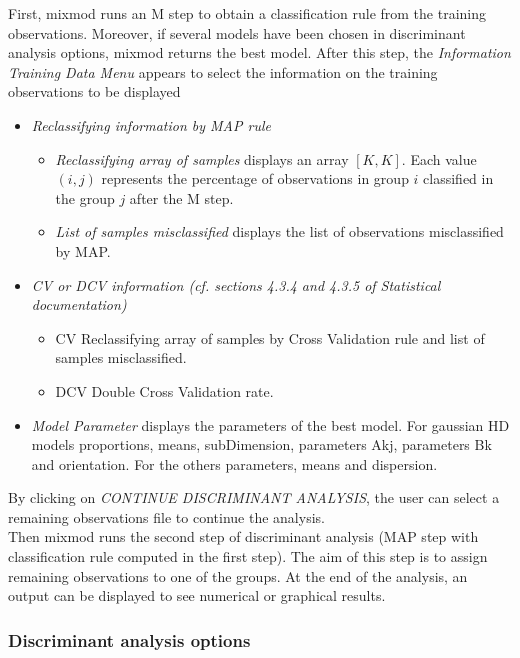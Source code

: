 First, {\sc mixmod} runs an M step to obtain a classification rule from the training observations. Moreover, if several models
have been chosen in discriminant analysis options, {\sc mixmod} returns the best model.
After this step, the {\em Information Training Data Menu} appears to select the information on the training
observations to be displayed
\begin{itemize}
	\item{\em Reclassifying information by MAP rule}
		\begin{itemize}
			\item{\em Reclassifying array of samples} displays an array $[K, K]$. Each value $(i,j)$ represents the
percentage of observations in group $i$ classified in the group $j$ after the M step.
			\item {\em List of samples misclassified} displays the list of observations misclassified by
MAP.
		\end{itemize}
	\item{\em CV or DCV information (cf. sections 4.3.4 and 4.3.5 of Statistical documentation)}
		\begin{itemize}
			\item{CV }Reclassifying array of samples by Cross Validation rule and list of samples misclassified.
			\item{DCV }Double Cross Validation rate.
		\end{itemize}
  \item {\em Model Parameter} displays the parameters of the best model.
For gaussian HD models proportions, means, subDimension, parameters Akj, parameters Bk and orientation. For the others
parameters, means and dispersion.
\end{itemize}

By clicking on {\em CONTINUE DISCRIMINANT ANALYSIS}, the user can select a remaining
observations file to continue the analysis.\\

Then {\sc mixmod} runs the second step of discriminant analysis (MAP step with classification rule computed in
the first step). The aim of this step is to assign remaining observations to one of the groups. At the end of the
analysis,
an output can be displayed to see numerical or graphical results.





\subsubsection{Discriminant analysis options} \label{discriminantAnalysisOptions}


